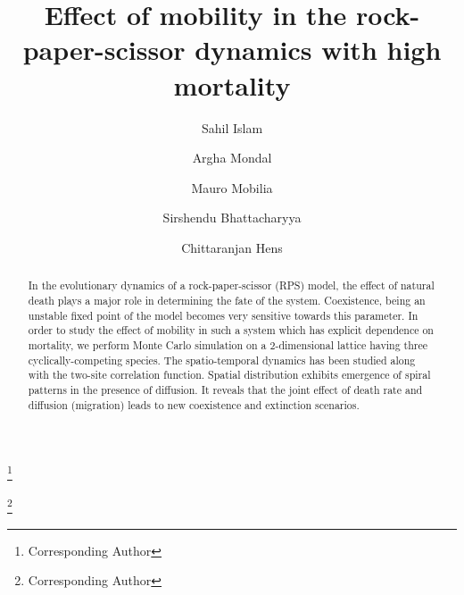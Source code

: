 \documentclass[aps, pre, twocolumn, amsmath, superscriptaddress,showkeys,showpacs]{revtex4-1}
\begin{document}
	
    \title{{Effect of mobility  in the  rock-paper-scissor dynamics with high mortality}}
	\author{Sahil Islam} 
	
	
	
	
	
	\author{Argha Mondal}
	
	\author{Mauro Mobilia}

	
	
	\author{Sirshendu Bhattacharyya} 
	\thanks{Corresponding Author}
	
	
	
	
	
	\author{Chittaranjan Hens}
	\thanks{Corresponding Author}
	
	
	
	\begin{abstract}
		\noindent
		In the evolutionary dynamics of a rock-paper-scissor (RPS) model, the effect of natural death plays a major role in determining the fate of the system. Coexistence, being an unstable fixed point of the model becomes very sensitive towards this parameter. In order to study the effect of mobility in such a system which has explicit dependence on mortality, we perform { Monte Carlo} simulation on a $2$-dimensional lattice having three cyclically-competing species. %
		 The spatio-temporal dynamics has been studied %
		 {along with the two-site correlation function}. Spatial distribution exhibits emergence of spiral patterns {in the presence} of diffusion. {It reveals that the joint effect of death rate and diffusion (migration) leads to new  coexistence and extinction scenarios.} 
		
	\end{abstract}	
	
\end{document}
